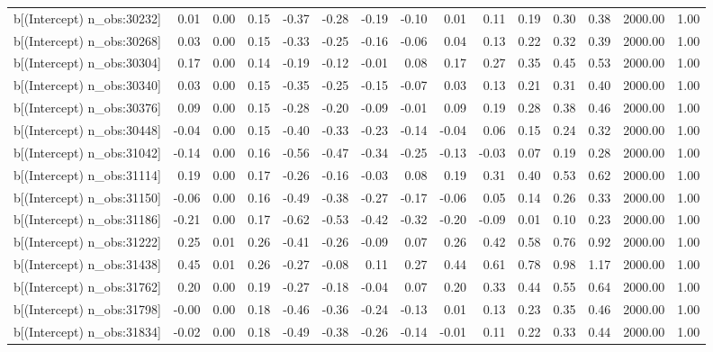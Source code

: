 \begin{table}[ht]
\begin{tabular}{rrrrrrrrrrrrrrr}
  b[(Intercept) n\_obs:30232] & 0.01 & 0.00 & 0.15 & -0.37 & -0.28 & -0.19 & -0.10 & 0.01 & 0.11 & 0.19 & 0.30 & 0.38 & 2000.00 & 1.00 \\ 
  b[(Intercept) n\_obs:30268] & 0.03 & 0.00 & 0.15 & -0.33 & -0.25 & -0.16 & -0.06 & 0.04 & 0.13 & 0.22 & 0.32 & 0.39 & 2000.00 & 1.00 \\ 
  b[(Intercept) n\_obs:30304] & 0.17 & 0.00 & 0.14 & -0.19 & -0.12 & -0.01 & 0.08 & 0.17 & 0.27 & 0.35 & 0.45 & 0.53 & 2000.00 & 1.00 \\ 
  b[(Intercept) n\_obs:30340] & 0.03 & 0.00 & 0.15 & -0.35 & -0.25 & -0.15 & -0.07 & 0.03 & 0.13 & 0.21 & 0.31 & 0.40 & 2000.00 & 1.00 \\ 
  b[(Intercept) n\_obs:30376] & 0.09 & 0.00 & 0.15 & -0.28 & -0.20 & -0.09 & -0.01 & 0.09 & 0.19 & 0.28 & 0.38 & 0.46 & 2000.00 & 1.00 \\ 
  b[(Intercept) n\_obs:30448] & -0.04 & 0.00 & 0.15 & -0.40 & -0.33 & -0.23 & -0.14 & -0.04 & 0.06 & 0.15 & 0.24 & 0.32 & 2000.00 & 1.00 \\ 
  b[(Intercept) n\_obs:31042] & -0.14 & 0.00 & 0.16 & -0.56 & -0.47 & -0.34 & -0.25 & -0.13 & -0.03 & 0.07 & 0.19 & 0.28 & 2000.00 & 1.00 \\ 
  b[(Intercept) n\_obs:31114] & 0.19 & 0.00 & 0.17 & -0.26 & -0.16 & -0.03 & 0.08 & 0.19 & 0.31 & 0.40 & 0.53 & 0.62 & 2000.00 & 1.00 \\ 
  b[(Intercept) n\_obs:31150] & -0.06 & 0.00 & 0.16 & -0.49 & -0.38 & -0.27 & -0.17 & -0.06 & 0.05 & 0.14 & 0.26 & 0.33 & 2000.00 & 1.00 \\ 
  b[(Intercept) n\_obs:31186] & -0.21 & 0.00 & 0.17 & -0.62 & -0.53 & -0.42 & -0.32 & -0.20 & -0.09 & 0.01 & 0.10 & 0.23 & 2000.00 & 1.00 \\ 
  b[(Intercept) n\_obs:31222] & 0.25 & 0.01 & 0.26 & -0.41 & -0.26 & -0.09 & 0.07 & 0.26 & 0.42 & 0.58 & 0.76 & 0.92 & 2000.00 & 1.00 \\ 
  b[(Intercept) n\_obs:31438] & 0.45 & 0.01 & 0.26 & -0.27 & -0.08 & 0.11 & 0.27 & 0.44 & 0.61 & 0.78 & 0.98 & 1.17 & 2000.00 & 1.00 \\ 
  b[(Intercept) n\_obs:31762] & 0.20 & 0.00 & 0.19 & -0.27 & -0.18 & -0.04 & 0.07 & 0.20 & 0.33 & 0.44 & 0.55 & 0.64 & 2000.00 & 1.00 \\ 
  b[(Intercept) n\_obs:31798] & -0.00 & 0.00 & 0.18 & -0.46 & -0.36 & -0.24 & -0.13 & 0.01 & 0.13 & 0.23 & 0.35 & 0.46 & 2000.00 & 1.00 \\ 
  b[(Intercept) n\_obs:31834] & -0.02 & 0.00 & 0.18 & -0.49 & -0.38 & -0.26 & -0.14 & -0.01 & 0.11 & 0.22 & 0.33 & 0.44 & 2000.00 & 1.00 \\ 

\end{tabular}
\end{table}
